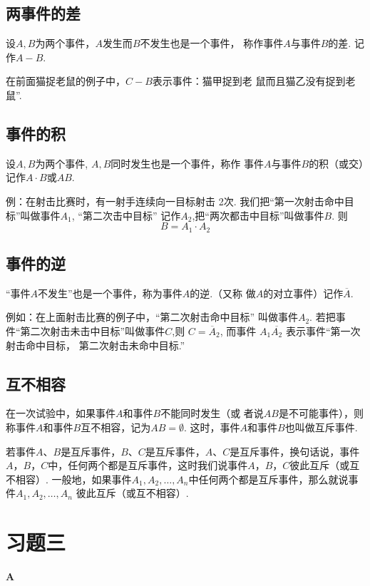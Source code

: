 \subsection{两事件的差}

设$A,B$为两个事件，$A$发生而$B$不发生也是一个事件，
称作事件$A$与事件$B$的差. 记作$A-B$.

在前面猫捉老鼠的例子中，$C-B$表示事件：猫甲捉到老
鼠而且猫乙没有捉到老鼠”.

\subsection{事件的积}

设$A,B$为两个事件, $A,B$同时发生也是一个事件，称作
事件$A$与事件$B$的积（或交）记作$A\cdot B$或$AB$.

例：在射击比赛时，有一射手连续向一目标射击 2次. 我们把“第一次射击命中目标”叫做事件$A_1$, “第二次击中目标” 记作$A_2$,把“两次都击中目标”叫做事件$B$. 则
$$B=A_{1}\cdot A_{2}$$

\subsection{事件的逆}

“事件$A$不发生”也是一个事件，称为事件$A$的逆.（又称
做$A$的对立事件）记作$\overline{A}$.

例如：在上面射击比赛的例子中，“第二次射击命中目标” 叫做事件$A_2$. 若把事件“第二次射击未击中目标”叫做事件$C$,则 $C=\overline{A}_{2}$, 而事件 $A_1\overline{A_2}$ 表示事件“第一次射击命中目标， 第二次射击未命中目标.”

\subsection{互不相容}

在一次试验中，如果事件$A$和事件$B$不能同时发生（或
者说$AB$是不可能事件），则称事件$A$和事件$B$互不相容，记为$AB=\emptyset$. 这时，事件$A$和事件$B$也叫做互斥事件.

若事件$A$、$B$是互斥事件，$B$、$C$是互斥事件，$A$、$C$是互斥事件，换句话说，事件$A$，$B$，$C$中，任何两个都是互斥事件，这时我们说事件$A$，$B$，$C$彼此互斥（或互不相容）. 一般地，如果事件$A_1,A_2,\ldots,A_n$中任何两个都是互斥事件，那么就说事件$A_1,A_2,\ldots,A_n$ 彼此互斥（或互不相容）.

\section*{习题三}
\begin{center}
\bfseries A
\end{center}

